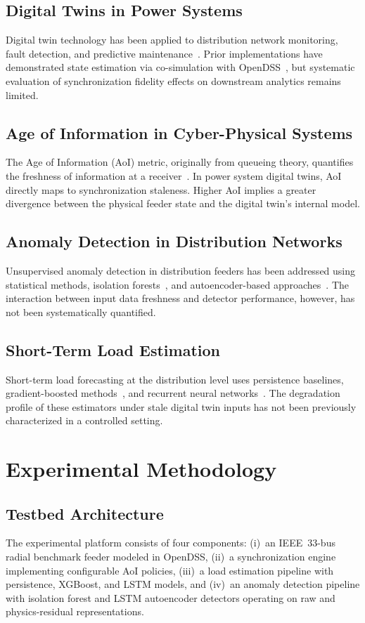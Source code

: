 \documentclass[journal]{IEEEtran}
\begin{document}
\subsection{Digital Twins in Power Systems}
Digital twin technology has been applied to distribution network monitoring,
fault detection, and predictive maintenance~\cite{ref_dt_survey}.
Prior implementations have demonstrated state estimation via co-simulation
with OpenDSS~\cite{ref_opendss}, but systematic evaluation of
synchronization fidelity effects on downstream analytics remains limited.

\subsection{Age of Information in Cyber-Physical Systems}
The Age of Information (AoI) metric, originally from queueing theory,
quantifies the freshness of information at a receiver~\cite{ref_aoi_theory}.
In power system digital twins, AoI directly maps to synchronization
staleness. Higher AoI implies a greater divergence between the physical
feeder state and the digital twin's internal model.

\subsection{Anomaly Detection in Distribution Networks}
Unsupervised anomaly detection in distribution feeders has been addressed
using statistical methods, isolation forests~\cite{ref_isolation_forest},
and autoencoder-based approaches~\cite{ref_lstm_ae}. The interaction
between input data freshness and detector performance, however, has
not been systematically quantified.

\subsection{Short-Term Load Estimation}
Short-term load forecasting at the distribution level uses persistence
baselines, gradient-boosted methods~\cite{ref_xgboost}, and recurrent
neural networks~\cite{ref_lstm_forecast}. The degradation profile of
these estimators under stale digital twin inputs has not been previously
characterized in a controlled setting.


\section{Experimental Methodology}
\label{sec:methodology}

\subsection{Testbed Architecture}
The experimental platform consists of four components:
(i)~an IEEE~33-bus radial benchmark feeder modeled in OpenDSS,
(ii)~a synchronization engine implementing configurable AoI policies,
(iii)~a load estimation pipeline with persistence, XGBoost, and LSTM models,
and (iv)~an anomaly detection pipeline with isolation forest and LSTM
autoencoder detectors operating on raw and physics-residual representations.
\end{document}
